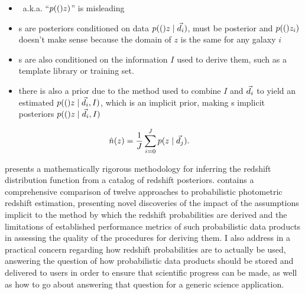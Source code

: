 \begin{itemize}
	\item \pzpdf\ a.k.a. ``$p(()z)$'' is misleading
	\item \pzpdf s are posteriors conditioned on data $p(()z \mid \vec{d}_{i})$, must be posterior  and $p(()z_{i})$ doesn't make sense because the domain of $z$ is the same for any galaxy $i$
	\item \pzpdf s are also conditioned on the information $I$ used to derive them, such as a template library or training set.
	\item there is also a prior due to the method used to combine $I$ and $\vec{d}_{i}$ to yield an estimated $p(()z \mid \vec{d}_{i}, I)$, which is an implicit prior, making \pzpdf s implicit posteriors $p(()z \mid \vec{d}_{i}, I)$
\end{itemize}

\begin{align}
\eqlabel{eqn:stackwithdata}
\hat{n}(z) &= \frac{1}{J} \sum_{i = 0}^{J} p(z \gvn \data_{j}) .
\end{align}




 presents a mathematically rigorous methodology for inferring the redshift distribution function from a catalog of redshift posteriors.
 contains a comprehensive comparison of twelve approaches to probabilistic photometric redshift estimation, presenting novel discoveries of the impact of the assumptions implicit to the method by which the redshift probabilities are derived and the limitations of established performance metrics of such probabilistic data products in assessing the quality of the procedures for deriving them.
I also address in  a practical concern regarding how redshift probabilities are to actually be used, answering the question of how probabilistic data products should be stored and delivered to users in order to ensure that scientific progress can be made, as well as how to go about answering that question for a generic science application.

